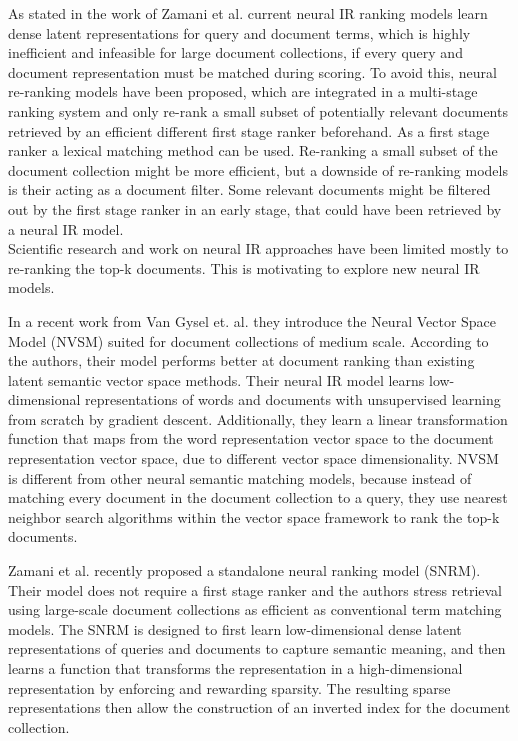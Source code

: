 As stated in the work of Zamani et al. \cite{zamani:2018:from-neural-reranking-to-neural-ranking} current neural IR ranking models learn dense latent representations for query and document terms, which is highly inefficient and infeasible for large document collections, if every query and document representation must be matched during scoring.
To avoid this, neural re-ranking models have been proposed, which are integrated in a multi-stage ranking system and only re-rank a small subset of potentially relevant documents retrieved by an efficient different first stage ranker beforehand. \cite{zamani:2018:from-neural-reranking-to-neural-ranking} 
As a first stage ranker a lexical matching method can be used. \cite{van-gysel:2017:neural-vector-spaces} 
Re-ranking a small subset of the document collection might be more efficient, but a downside of re-ranking models is their acting as a document filter.
Some relevant documents might be filtered out by the first stage ranker in an early stage, that could have been retrieved by a neural IR model. \cite{zamani:2018:from-neural-reranking-to-neural-ranking}
\\Scientific research and work on neural IR approaches have been limited mostly to re-ranking the top-k documents. \cite{mitra:2018:introduction-neural-ir}
This is motivating to explore new neural IR models.

In a recent work from Van Gysel et. al. \cite{van-gysel:2017:neural-vector-spaces} they introduce the Neural Vector Space Model (NVSM) suited for document collections of medium scale.
According to the authors, their model performs better at document ranking than existing latent semantic vector space methods.
Their neural IR model learns low-dimensional representations of words and documents with unsupervised learning from scratch by gradient descent.
Additionally, they learn a linear transformation function that maps from the word representation vector space to the document representation vector space, due to different vector space dimensionality.
NVSM is different from other neural semantic matching models, because instead of matching every document in the document collection to a query, they use nearest neighbor search algorithms within the vector space framework to rank the top-k documents. \cite{van-gysel:2017:neural-vector-spaces}

Zamani et al. recently proposed \cite{zamani:2018:from-neural-reranking-to-neural-ranking} a standalone neural ranking model (SNRM).
Their model does not require a first stage ranker and the authors stress retrieval using large-scale document collections as efficient as conventional term matching models.
The SNRM is designed to first learn low-dimensional dense latent representations of queries and documents to capture semantic meaning, and then learns a function that transforms the representation in a high-dimensional representation by enforcing and rewarding sparsity.
The resulting sparse representations then allow the construction of an inverted index for the document collection. \cite{zamani:2018:from-neural-reranking-to-neural-ranking}
